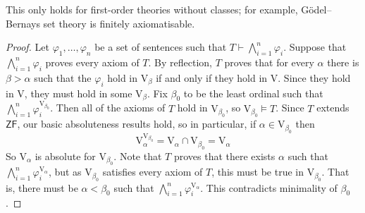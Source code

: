 This only holds for first-order theories without classes; for example, G\"odel--Bernays set theory is finitely axiomatisable.
\begin{proof}
    Let \( \varphi_1, \dots, \varphi_n \) be a set of sentences such that \( T \vdash \bigwedge_{i=1}^n \varphi_i \).
    Suppose that \( \bigwedge_{i=1}^n \varphi_i \) proves every axiom of \( T \).
    By reflection, \( T \) proves that for every \( \alpha \) there is \( \beta > \alpha \) such that the \( \varphi_i \) hold in \( \mathrm{V}_\beta \) if and only if they hold in \( \mathrm{V} \).
    Since they hold in \( \mathrm{V} \), they must hold in some \( \mathrm{V}_\beta \).
    Fix \( \beta_0 \) to be the least ordinal such that \( \bigwedge_{i=1}^n \varphi_i^{\mathrm{V}_{\beta_0}} \).
    Then all of the axioms of \( T \) hold in \( \mathrm{V}_{\beta_0} \), so \( \mathrm{V}_{\beta_0} \vDash T \).
    Since \( T \) extends \( \mathsf{ZF} \), our basic absoluteness results hold, so in particular, if \( \alpha \in \mathrm{V}_{\beta_0} \) then
    \[ \mathrm{V}_\alpha^{\mathrm{V}_{\beta_0}} = \mathrm{V}_\alpha \cap \mathrm{V}_{\beta_0} = \mathrm{V}_\alpha \]
    So \( \mathrm{V}_\alpha \) is absolute for \( \mathrm{V}_{\beta_0} \).
    Note that \( T \) proves that there exists \( \alpha \) such that \( \bigwedge_{i=1}^n \varphi_i^{\mathrm{V}_\alpha} \), but as \( \mathrm{V}_{\beta_0} \) satisfies every axiom of \( T \), this must be true in \( \mathrm{V}_{\beta_0} \).
    That is, there must be \( \alpha < \beta_0 \) such that \( \bigwedge_{i=1}^n \varphi_i^{\mathrm{V}_\alpha} \).
    This contradicts minimality of \( \beta_0 \).
\end{proof}

